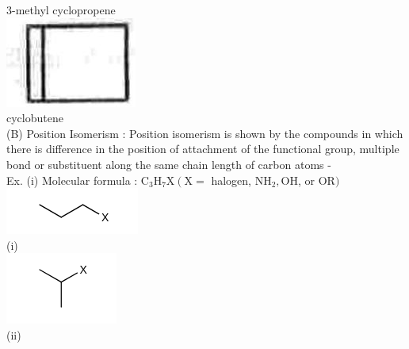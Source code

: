 \documentclass[10pt]{article}
\begin{document}
3-methyl cyclopropene\\
\includegraphics[max width=\textwidth, center]{2025_01_28_8470952b98110cec3aabg-039(6)}\\
cyclobutene\\
(B) Position Isomerism : Position isomerism is shown by the compounds in which there is difference in the position of attachment of the functional group, multiple bond or substituent along the same chain length of carbon atoms -\\
Ex. (i) Molecular formula : $\mathrm{C}_{3} \mathrm{H}_{7} \mathrm{X}\left(\mathrm{X}=\right.$ halogen, $\mathrm{NH}_{2}, \mathrm{OH}$, or OR$)$\\
\includegraphics{smile-0e3e851eaab6048599a8594770a3987768853c33}\\
(i)\\
\includegraphics{smile-d2fd3a2bf94fb9514f64ae09d92c0cf4e2772ac1}\\
(ii)
\end{document}
